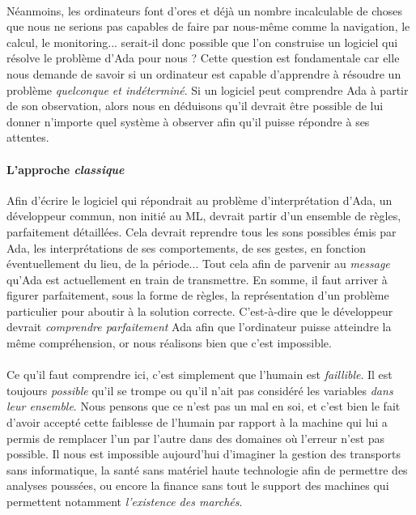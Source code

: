 \paragraph{} Néanmoins, les ordinateurs font d'ores et déjà un nombre incalculable de choses que nous ne serions pas capables de faire
par nous-même comme la navigation, le calcul, le monitoring... serait-il donc possible que l'on construise un logiciel qui résolve le problème
d'Ada pour nous ? Cette question est fondamentale car elle nous demande de savoir si un ordinateur est capable d'apprendre à résoudre un
problème \emph{quelconque et indéterminé}. Si un logiciel peut comprendre Ada à partir de son observation, alors nous en déduisons qu'il devrait
être possible de lui donner n'importe quel système à observer afin qu'il puisse répondre à ses attentes.   

\paragraph{L'approche \emph{classique}} Afin d'écrire le logiciel qui répondrait au problème d'interprétation d'Ada, un développeur commun,
non initié au ML, devrait partir d'un ensemble de règles, parfaitement détaillées. Cela devrait reprendre tous les sons possibles émis par Ada,
les interprétations de ses comportements, de ses gestes, en fonction éventuellement du lieu, de la période... Tout cela afin de parvenir au 
\emph{message} qu'Ada est actuellement en train de transmettre. En somme, il faut arriver à figurer parfaitement, sous la forme de règles,
la représentation d'un problème particulier pour aboutir à la solution correcte. C'est-à-dire que le développeur devrait \emph{comprendre parfaitement}
Ada afin que l'ordinateur puisse atteindre la même compréhension, or nous réalisons bien que c'est impossible.

\paragraph{} Ce qu'il faut comprendre ici, c'est simplement que l'humain est \emph{faillible}. Il est toujours \emph{possible} qu'il se trompe
ou qu'il n'ait pas considéré les variables \emph{dans leur ensemble}. Nous pensons que ce n'est pas un mal en soi, et c'est bien le fait d'avoir accepté cette
faiblesse de l'humain par rapport à la machine qui lui a permis de remplacer l'un par l'autre dans des domaines où l'erreur n'est pas possible.
Il nous est impossible aujourd'hui d'imaginer la gestion des transports sans informatique, la santé sans matériel haute technologie afin de
permettre des analyses poussées, ou encore la finance sans tout le support des machines qui permettent notamment \emph{l'existence des marchés}. 


